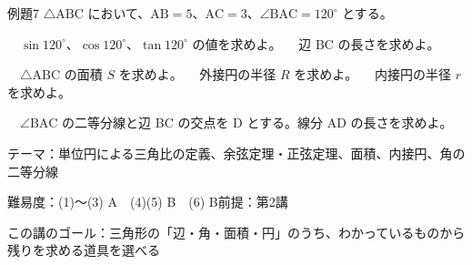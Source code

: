 \documentclass[paper=b5j, fontsize=8pt, fleqn, twoside]{jlreq}
\begin{document}
\begin{ascolorbox4A}[出典：オリジナル]{例題7}
  $\triangle\mathrm{ABC}$ において、$\mathrm{AB}=5$、$\mathrm{AC}=3$、$\angle\mathrm{BAC}=120^\circ$ とする。\par
  　$\sin120^\circ$、$\cos120^\circ$、$\tan120^\circ$ の値を求めよ。\qquad
  　辺 BC の長さを求めよ。\par
  　$\triangle\mathrm{ABC}$ の面積 $S$ を求めよ。\qquad
  　外接円の半径 $R$ を求めよ。\qquad
  　内接円の半径 $r$ を求めよ。\par
  　$\angle\mathrm{BAC}$ の二等分線と辺 BC の交点を D とする。線分 AD の長さを求めよ。
\end{ascolorbox4A}

\begin{Data}
  テーマ：単位円による三角比の定義、余弦定理・正弦定理、面積、内接円、角の二等分線\par
  難易度：(1)〜(3) A　(4)(5) B　(6) B\quad 前提：第2講\par
  この講のゴール：三角形の「辺・角・面積・円」のうち、わかっているものから残りを求める道具を選べる
\end{Data}
\end{document}
